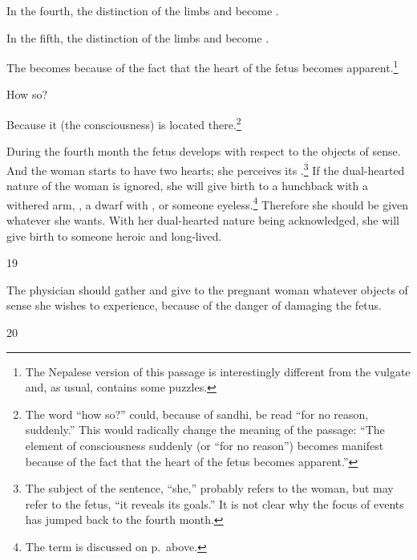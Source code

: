 \begin{translation}
In the fourth, the distinction of the limbs and  become .  
    
In the fifth, the distinction of the limbs and  become .
    
The  becomes
 because of the fact that the heart of the
fetus becomes apparent.\footnote{The Nepalese version of this passage
    is interestingly different from the vulgate and, as usual, contains
    some puzzles.}   
    
    How so?  
    
    Because it (the consciousness) is located
    there.\footnote{The word  “how so?” could, because of
        sandhi, be read  “for no reason, suddenly.”  This would
        radically change the meaning of the passage: “The element of
        consciousness suddenly (or “for no reason”) becomes manifest because
        of the fact that the heart of the fetus becomes apparent.”} 
        
        During the
        fourth month the fetus develops  with
        respect to the objects of sense. And the woman starts to have two
        hearts; she perceives its .\footnote{The subject
            of the sentence, “she,” probably refers to the woman, but may refer to
            the fetus, “it reveals its goals.”  It is not clear why the focus of
            events has jumped back to the fourth month.} If the dual-hearted
            nature of the woman is ignored, she will give birth to a hunchback
            with a withered arm, , a dwarf with
            , or someone eyeless.\footnote{The
                term  is discussed on p.\,\pageref{ṣaṇḍha} above.}
                Therefore she should be given whatever she wants. With her
                dual-hearted nature being acknowledged, she will give birth to someone
                heroic and long-lived.
        

\item[19]

The physician should gather and give to the pregnant woman whatever objects of 
sense she wishes to experience, because of the danger of damaging the fetus. 

\item [20]


\end{translation}
